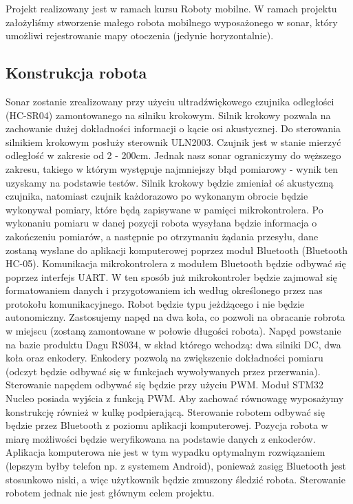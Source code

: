 Projekt realizowany jest w ramach kursu Roboty mobilne. W ramach projektu założyliśmy stworzenie małego robota mobilnego wyposażonego w sonar, który umożliwi rejestrowanie mapy otoczenia (jedynie horyzontalnie).
\subsection{Konstrukcja robota}
Sonar zostanie zrealizowany przy użyciu ultradźwiękowego czujnika odległości (HC-SR04) zamontowanego na silniku krokowym. Silnik krokowy pozwala na zachowanie dużej dokładności informacji o kącie osi akustycznej. Do sterowania silnikiem krokowym posłuży sterownik ULN2003. Czujnik jest w stanie mierzyć odległość w zakresie od 2 - 200cm. Jednak nasz sonar ograniczymy do węższego zakresu, takiego w którym występuje najmniejszy błąd pomiarowy - wynik ten uzyskamy na podstawie testów. Silnik krokowy będzie zmieniał oś akustyczną czujnika, natomiast czujnik każdorazowo po wykonanym obrocie będzie wykonywał pomiary, które będą zapisywane w pamięci mikrokontrolera. Po wykonaniu pomiaru w danej pozycji robota wysyłana będzie informacja o zakończeniu pomiarów, a następnie po otrzymaniu żądania przesyłu, dane zostaną wysłane do aplikacji komputerowej poprzez moduł Bluetooth (Bluetooth HC-05). Komunikacja mikrokontrolera z modułem Bluetooth będzie odbywać się poprzez interfejs UART. W ten sposób już mikrokontroler będzie zajmował się formatowaniem danych i przygotowaniem ich według określonego przez nas protokołu komunikacyjnego. \newline 
Robot będzie typu jeżdżącego i nie będzie autonomiczny. Zastosujemy napęd na dwa koła, co pozwoli na obracanie robrota w miejscu (zostaną zamontowane w połowie długości robota). Napęd powstanie na bazie produktu Dagu RS034, w skład którego wchodzą: dwa silniki DC, dwa koła oraz enkodery. Enkodery pozwolą na zwiększenie dokładności pomiaru (odczyt będzie odbywać się w funkcjach wywoływanych przez przerwania). Sterowanie napędem odbywać się będzie przy użyciu PWM. Moduł STM32 Nucleo posiada wyjścia z funkcją PWM. Aby zachować równowagę wyposażymy konstrukcję również w kulkę podpierającą. Sterowanie robotem odbywać się będzie przez Bluetooth z poziomu aplikacji komputerowej. Pozycja robota w miarę możliwości będzie weryfikowana na podstawie danych z enkoderów. Aplikacja komputerowa nie jest w tym wypadku optymalnym rozwiązaniem (lepszym byłby telefon np. z systemem Android), ponieważ zasięg Bluetooth jest stosunkowo niski, a więc użytkownik będzie zmuszony śledzić robota. Sterowanie robotem jednak nie jest głównym celem projektu.
